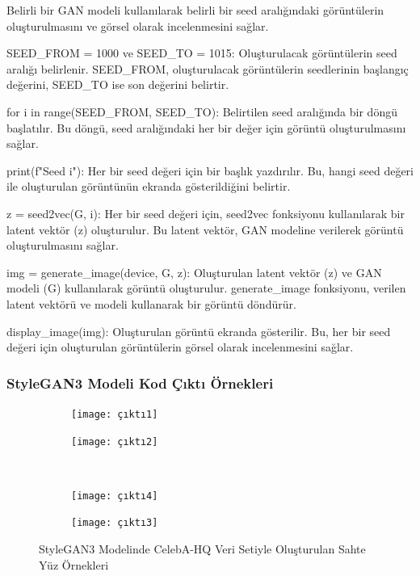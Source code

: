 \documentclass[12pt, a4paper]{article}
\begin{document}
	Belirli bir GAN modeli kullanılarak belirli bir seed aralığındaki görüntülerin oluşturulmasını ve görsel olarak incelenmesini sağlar.
	
	SEED\_FROM = 1000 ve SEED\_TO = 1015: Oluşturulacak görüntülerin seed aralığı belirlenir. SEED\_FROM, oluşturulacak görüntülerin seedlerinin başlangıç değerini, SEED\_TO ise son değerini belirtir.
	
	for i in range(SEED\_FROM, SEED\_TO): Belirtilen seed aralığında bir döngü başlatılır. Bu döngü, seed aralığındaki her bir değer için görüntü oluşturulmasını sağlar.
	
	print(f"Seed {i}"): Her bir seed değeri için bir başlık yazdırılır. Bu, hangi seed değeri ile oluşturulan görüntünün ekranda gösterildiğini belirtir.
	
	z = seed2vec(G, i): Her bir seed değeri için, seed2vec fonksiyonu kullanılarak bir latent vektör (z) oluşturulur. Bu latent vektör, GAN modeline verilerek görüntü oluşturulmasını sağlar.
	
	img = generate\_image(device, G, z): Oluşturulan latent vektör (z) ve GAN modeli (G) kullanılarak görüntü oluşturulur. generate\_image fonksiyonu, verilen latent vektörü ve modeli kullanarak bir görüntü döndürür.
	
	display\_image(img): Oluşturulan görüntü ekranda gösterilir. Bu, her bir seed değeri için oluşturulan görüntülerin görsel olarak incelenmesini sağlar.

	\subsubsection{StyleGAN3 Modeli Kod Çıktı Örnekleri}
	
	\begin{figure}[htbp]
		\centering
		\begin{subfigure}{0.34\textwidth}
			\centering
			\texttt{[image: çıktı1]}
			\caption{}
			\label{fig:emg1}
		\end{subfigure}
		\hfill
		\begin{subfigure}{0.34\textwidth}
			\centering
			\texttt{[image: çıktı2]}
			\caption{}
			\label{fig:emg2}
		\end{subfigure}
		\\
		\begin{subfigure}{0.34\textwidth}
			\centering
			\texttt{[image: çıktı4]}
			\caption{}
			\label{fig:emg3}
		\end{subfigure}
		\hfill
		\begin{subfigure}{0.34\textwidth}
			\centering
			\texttt{[image: çıktı3]}
			\caption{}
			\label{fig:emg4}
		\end{subfigure}
		\caption{StyleGAN3 Modelinde CelebA-HQ Veri Setiyle Oluşturulan Sahte Yüz Örnekleri}
		\label{fig:fourr_images}
	\end{figure}
	\FloatBarrier
	\clearpage
\end{document}
